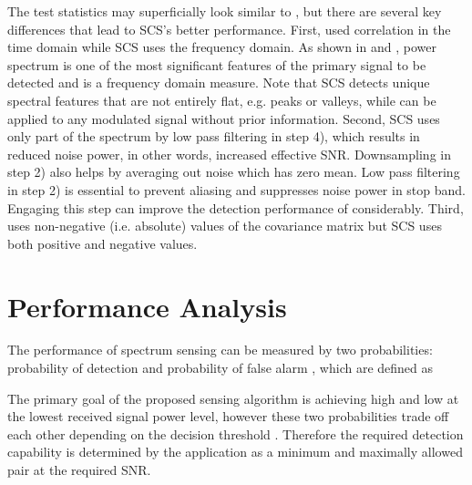 \documentclass[draftclsnofoot,onecolumn,12pt]{IEEEtran}
\begin{document}
The test statistics  may superficially look similar to \cite{ZenLia09}, but there are several key differences that lead to SCS's better performance. 
First, \cite{ZenLia09} used correlation in the time domain while SCS uses the frequency domain.
As shown in \cite{CorGho07} and  \cite{HanSho06}, power spectrum is one of the most significant features of the primary signal to be detected and is a frequency domain measure. Note that SCS detects unique spectral features that are not entirely flat, e.g. peaks or valleys, while \cite{ZenLia09} can be applied to any modulated signal without prior information.
Second, SCS uses only part of the spectrum by low pass filtering in step 4), which results in reduced noise power, in other words, increased effective SNR. Downsampling in step 2) also helps by averaging out noise which has zero mean. Low pass filtering in step 2) is essential to prevent aliasing and suppresses noise power in stop band. Engaging this step can improve the detection performance of \cite{ZenLia09} considerably.
Third, \cite{ZenLia09} uses non-negative (i.e. absolute) values of the covariance matrix but SCS uses both positive and negative values. 

\section{Performance Analysis}
\label{sec:SCSAnalysis}

The performance of spectrum sensing can be measured by two probabilities: probability of detection  and probability of false alarm , which are defined as

The primary goal of the proposed sensing algorithm is achieving high  and low  at the lowest received signal power level,
however these two probabilities trade off each other depending on the decision threshold .
Therefore the required detection capability is determined by the application as a minimum  and maximally allowed  pair at the required SNR.
\end{document}
